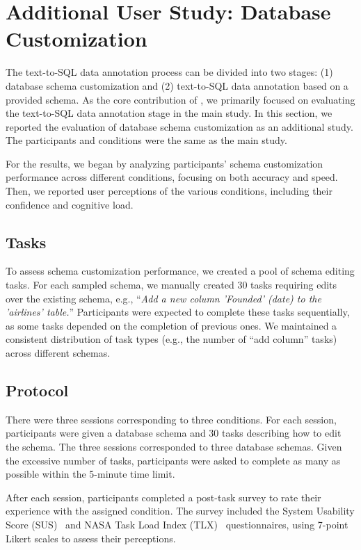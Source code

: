 \appendix


\section{Additional User Study: Database Customization}
\label{app:additional_study}

The text-to-SQL data annotation process can be divided into two stages: (1) database schema customization and (2) text-to-SQL data annotation based on a provided schema.
As the core contribution of {\tool}, we primarily focused on evaluating the text-to-SQL data annotation stage in the main study. 
In this section, we reported the evaluation of database schema customization as an additional study.
The participants and conditions were the same as the main study.

For the results, we began by analyzing participants' schema customization performance across different conditions, focusing on both accuracy and speed. 
Then, we reported user perceptions of the various conditions, including their confidence and cognitive load.

\subsection{Tasks}
To assess schema customization performance, we created a pool of schema editing tasks. For each sampled schema, we manually created 30 tasks requiring edits over the existing schema, e.g., ``\textit{Add a new column 'Founded' (date) to the 'airlines' table.}''
Participants were expected to complete these tasks sequentially, as some tasks depended on the completion of previous ones. 
We maintained a consistent distribution of task types (e.g., the number of ``add column'' tasks) across different schemas.

\subsection{Protocol}
There were three sessions corresponding to three conditions.
For each session, participants were given a database schema and 30 tasks describing how to edit the schema. The three sessions corresponded to three database schemas. Given the excessive number of tasks, participants were asked to complete as many as possible within the 5-minute time limit.

After each session, participants completed a post-task survey to rate their experience with the assigned condition. The survey included the System Usability Score (SUS)~\cite{sus} and NASA Task Load Index (TLX)~\cite{NASA-TLX} questionnaires, using 7-point Likert scales to assess their perceptions.




